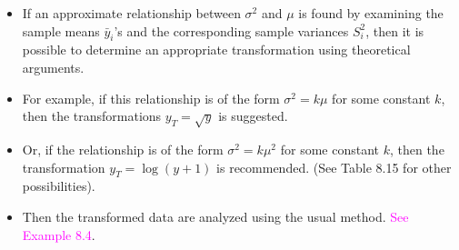 \documentclass[xcolor=dvipsnames,12pt]{beamer}
\begin{document}
\begin{frame}
\begin{itemize}
\item If an approximate relationship between $\sigma^2$ and $\mu$  is found by examining the sample means $\bar{y}_i$'s and
the corresponding sample variances $S_i^2$, then it is possible to 
determine an appropriate transformation using theoretical arguments.
\item For example, if this relationship is of the form $\sigma^2=k\mu$ for some constant $k$, 
 then the transformations $y_T = \sqrt{y}$ is suggested.
\item  Or, if the relationship is of the form $\sigma^2=k\mu^2$ for some constant $k$, then
the transformation $y_T = \log(y+1)$ is recommended. (See Table 8.15 for other possibilities).
\item Then the transformed data are analyzed using the usual method.
 \textcolor{magenta}{See Example 8.4}.
\end{itemize}
\end{frame}
\end{document}
